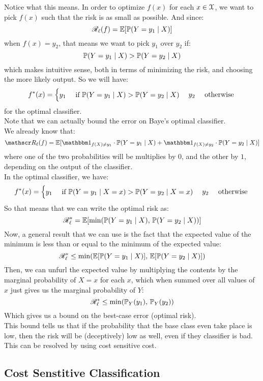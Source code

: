 \documentclass[12pt]{article}
\begin{document}
Notice what this means.
In order to optimize $f(x)$
for each $x \in \mathcal{X}$,
we want to pick $f(x)$
such that the risk is as small as possible.
And since:
\[ \mathscr{R}_\ell(f)
= \mathbb{E}[ \mathbb{P}(Y = y_1 \mid X)] \]
when $f(x) = y_2$,
that means we want to pick $y_1$
over $y_2$ if:
\[ \mathbb{P}(Y = y_1 \mid X) >
\mathbb{P}(Y = y_2 \mid X)  \]
which makes intuitive sense, both in terms 
of minimizing the risk,
and choosing the more likely output.
So we will have:
\[ f^*(x) = \begin{cases} y_1 \quad \text{ if }
\mathbb{P}(Y = y_1 \mid X) >
\mathbb{P}(Y = y_2 \mid X) \end{cases}
{y_2 \quad \text{ otherwise }} \]
for the optimal classifier. \\

Note that we can actually bound the error
on Baye's optimal classifier. \\
We already know that:
\[ \rscr_\ell(f)
= \ebb[ \indicator_{f(X) \neq y_1}\cdot
\pbb(Y = y_1 \mid X) +
\indicator_{f(X) \neq y_2}\cdot
\pbb(Y = y_2 \mid X)] \]
where one of the two probabilities
will be multiplies by $0$,
and the other by $1$,
depending on the output of the classifier. \\
In the optimal classifier, we have:
\[ f^*(x) = \begin{cases} y_1 \quad \text{ if }
\mathbb{P}(Y = y_1 \mid X = x) >
\mathbb{P}(Y = y_2 \mid X = x) \end{cases}
{y_2 \quad \text{ otherwise }} \]
So that means that we can write the
optimal risk as:
\[ \mathscr{R}_\ell^*
= \mathbb{E}[ \min(
\mathbb{P}(Y = y_1 \mid X), \,
\mathbb{P}(Y = y_2 \mid X))] \]
Now, a general result that we can use
is the fact that the expected value of the
minimum is less than or equal to the minimum
of the expected value:
\[ \mathscr{R}_\ell^* \leq \min(
\mathbb{E}[\mathbb{P}(Y = y_1 \mid X)], \,
\mathbb{E}[\mathbb{P}(Y = y_2 \mid X)]) \]
Then, we can unfurl the expected value
by multiplying the contents by the
marginal probability of $X = x$
for each $x$,
which when summed over all values of $x$
just gives us the marginal probability of $Y$:
\[ \mathscr{R}_\ell^* \leq \min(
\mathbb{P}_Y(y_1), \, \mathbb{P}_Y(y_2)) \]
Which gives us a bound on the best-case error
(optimal risk). \\

This bound tells us that
if the probability that the base class even
take place is low,
then the risk will be (deceptively) low
as well,
even if they classifier is bad. \\

This can be resolved by using
cost sensitive cost. \\

\newpage

\subsection*{Cost Senstitive Classification}
\end{document}

